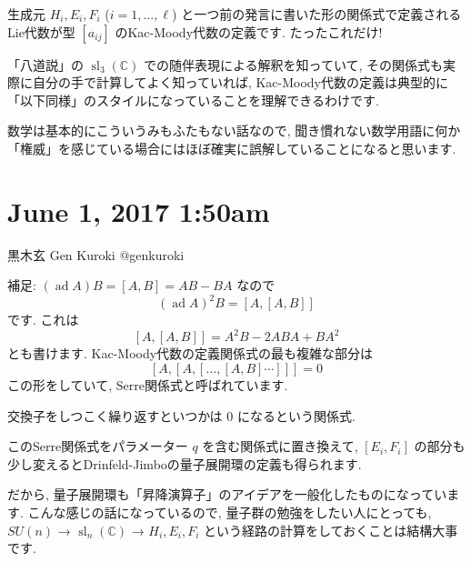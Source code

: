 \documentclass[12pt,twoside]{jarticle}
\theoremstyle{jplain}
\theoremstyle{jplain}
\theoremstyle{jplain}
\numberwithin{theorem}{section}
\numberwithin{equation}{section}
\numberwithin{figure}{section}
\numberwithin{table}{section}
\begin{document}
生成元 $H_i,E_i,F_i$ ($i=1,\ldots,\ell$) と一つ前の発言に書いた形の関係式で定義されるLie代数が型 $[a_{ij}]$ のKac-Moody代数の定義です. たったこれだけ! 

「八道説」の $\operatorname{sl}_3(\mathbb C)$ での随伴表現による解釈を知っていて, その関係式も実際に自分の手で計算してよく知っていれば, Kac-Moody代数の定義は典型的に「以下同様」のスタイルになっていることを理解できるわけです. 

数学は基本的にこういうみもふたもない話なので, 聞き慣れない数学用語に何か「権威」を感じている場合にはほぼ確実に誤解していることになると思います. 





\section{June  1, 2017  1:50am}








黒木玄 Gen Kuroki
@genkuroki


補足: $(\operatorname{ad} A)B=[A,B]=AB-BA$ なので\[
(\operatorname{ad} A)^2 B=[A,[A,B]]
\]です. これは\[
[A,[A,B]]=A^2B-2ABA+BA^2
\]とも書けます. Kac-Moody代数の定義関係式の最も複雑な部分は\[
[A,[A,[\ldots,[A,B]\cdots]]]=0
\]この形をしていて, Serre関係式と呼ばれています. 

交換子をしつこく繰り返すといつかは $0$ になるという関係式. 

このSerre関係式をパラメーター $q$ を含む関係式に置き換えて, $[E_i,F_i]$ の部分も少し変えるとDrinfeld-Jimboの量子展開環の定義も得られます. 

だから, 量子展開環も「昇降演算子」のアイデアを一般化したものになっています. こんな感じの話になっているので, 量子群の勉強をしたい人にとっても, $SU(n)$ → $\operatorname{sl}_n(\mathbb C)$ → $H_i,E_i,F_i$ という経路の計算をしておくことは結構大事です. 



\end{document}
